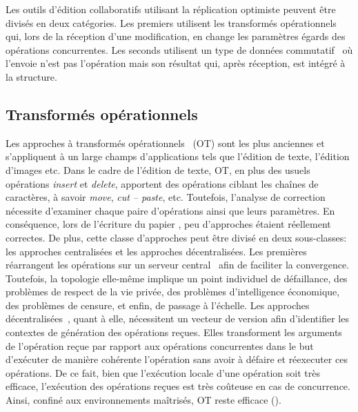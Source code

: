 Les outils d'édition collaboratifs utilisant la réplication optimiste peuvent
être divisés en deux catégories. Les premiers utilisent les transformés
opérationnels~\cite{sun2009contextbased, sun1998operational} qui, lors de la
réception d'une modification, en change les paramètres égards des opérations
concurrentes. Les seconds utilisent un type de données
commutatif~\cite{shapiro2011comprehensive, shapiro2011conflict} où l'envoie
n'est pas l'opération mais son résultat qui, après réception, est intégré à la
structure. 

\subsection{Transformés opérationnels}

Les approches à transformés opérationnels~\cite{sun2009contextbased,
  sun1998operational} (OT) sont les plus anciennes et s'appliquent à un large
champs d'applications tels que l'édition de texte, l'édition d'images etc. Dans
le cadre de l'édition de texte, OT, en plus des usuels opérations \emph{insert}
et \emph{delete}, apportent des opérations ciblant les chaînes de caractères, à
savoir \emph{move}, \emph{cut -- paste}, etc. Toutefois, l'analyse de correction
nécessite d'examiner chaque paire d'opérations ainsi que leurs paramètres. En
conséquence, lors de l'écriture du papier \cite{imine2003proving}, peu
d'approches étaient réellement correctes. De plus, cette classe d'approches peut
être divisé en deux sous-classes: les approches centralisées et les approches
décentralisées. Les premières réarrangent les opérations sur un serveur
central~\cite{nichols1995high} afin de faciliter la convergence. Toutefois, la
topologie elle-même implique un point individuel de défaillance, des problèmes
de respect de la vie privée, des problèmes d'intelligence économique, des
problèmes de censure, et enfin, de passage à l'échelle. Les approches
décentralisées~\cite{sun2009contextbased}, quant à elle, nécessitent un vecteur
de version afin d'identifier les contextes de génération des opérations
reçues. Elles transforment les arguments de l'opération reçue par rapport aux
opérations concurrentes dans le but d'exécuter de manière cohérente l'opération
sans avoir à défaire et réexecuter ces opérations. De ce fait, bien que
l'exécution locale d'une opération soit très efficace, l'exécution des
opérations reçues est très coûteuse en cas de concurrence. Ainsi, confiné aux
environnements maîtrisés, OT reste efficace ().

